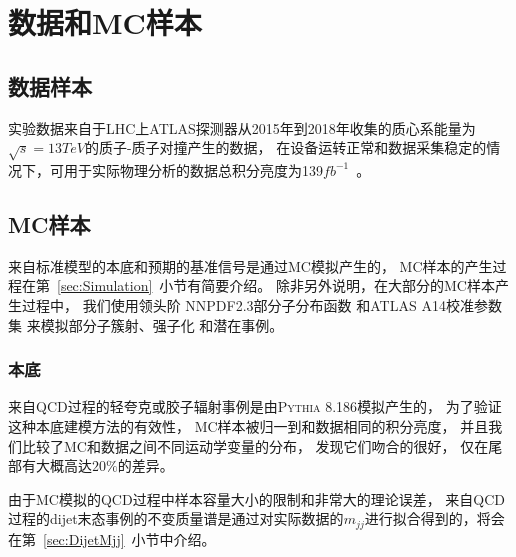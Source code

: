 \section{数据和MC样本}
\label{sec:DijetData}

\subsection{数据样本}
\label{sec:DijetDataS}

实验数据来自于LHC上ATLAS探测器从2015年到2018年收集的质心系能量为$\sqrt{s}=13TeV$的质子-质子对撞产生的数据，
在设备运转正常和数据采集稳定的情况下，可用于实际物理分析的数据总积分亮度为139$fb^{-1}$~\cite{ATLASWEB1}。

\subsection{MC样本}
\label{sec:DijetMCS}

来自标准模型的本底和预期的基准信号是通过MC模拟产生的，
MC样本的产生过程在第~\ref{sec:Simulation}~小节有简要介绍。
除非另外说明，在大部分的MC样本产生过程中，
我们使用领头阶
NNPDF2.3部分子分布函数
和\textsc{ATLAS A14}校准参数集
来模拟部分子簇射、强子化
和潜在事例。

\subsubsection{本底}
\label{sec:DijetMCQCD}

来自QCD过程的轻夸克或胶子辐射事例是由\textsc{Pythia 8.186}模拟产生的，
为了验证这种本底建模方法的有效性，
MC样本被归一到和数据相同的积分亮度，
并且我们比较了MC和数据之间不同运动学变量的分布，
发现它们吻合的很好，%
仅在尾部有大概高达$20\%$的差异。

由于MC模拟的QCD过程中样本容量大小的限制和非常大的理论误差，    
来自QCD过程的dijet末态事例的不变质量谱是通过对实际数据的$m_{jj}$进行拟合得到的，将会在第~\ref{sec:DijetMjj}~小节中介绍。

